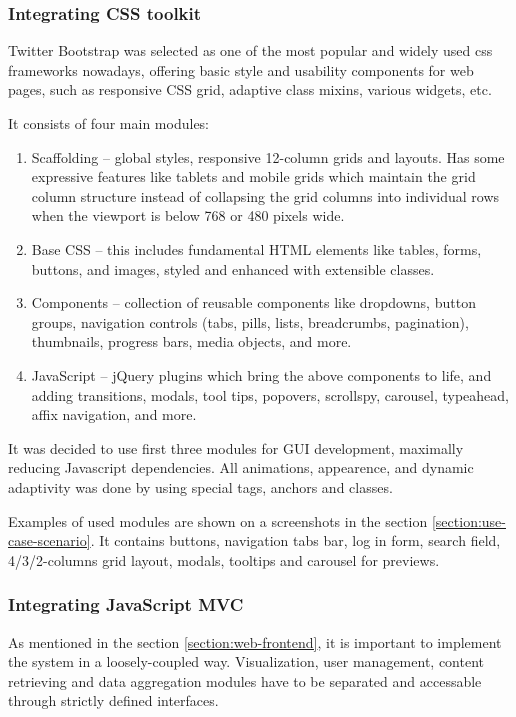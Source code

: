    \subsubsection{Integrating CSS toolkit}
	Twitter Bootstrap was selected as one of the most popular and widely used css frameworks nowadays, offering basic style and usability components for web pages, such as responsive CSS grid, adaptive class mixins, various widgets, etc. 

	It consists of four main modules:
	\begin{enumerate}
	\item Scaffolding – global styles, responsive 12-column grids and layouts. Has some expressive features like tablets and mobile grids which maintain the grid column structure instead of collapsing the grid columns into individual rows when the viewport is below 768 or 480 pixels wide.
	\item Base CSS – this includes fundamental HTML elements like tables, forms, buttons, and images, styled and enhanced with extensible classes.
	\item Components – collection of reusable components like dropdowns, button groups, navigation controls (tabs, pills, lists, breadcrumbs, pagination), thumbnails, progress bars, media objects, and more.
	\item JavaScript – jQuery plugins which bring the above components to life, and adding transitions, modals, tool tips, popovers, scrollspy, carousel, typeahead, affix navigation, and more. 
	\end{enumerate}

	It was decided to use first three modules for GUI development, maximally reducing Javascript dependencies. All animations, appearence, and dynamic adaptivity was done by using special tags, anchors and classes.

 	Examples of used modules are shown on a screenshots in the section \ref{section:use-case-scenario}. It contains buttons, navigation tabs bar, log in form, search field, 4/3/2-columns  grid layout, modals, tooltips and carousel for previews.

\subsubsection{Integrating JavaScript MVC}
	As mentioned in the section \ref{section:web-frontend}, it is important to implement the system in a loosely-coupled way. Visualization, user management, content retrieving and data aggregation modules have to be separated and accessable through strictly defined interfaces.

